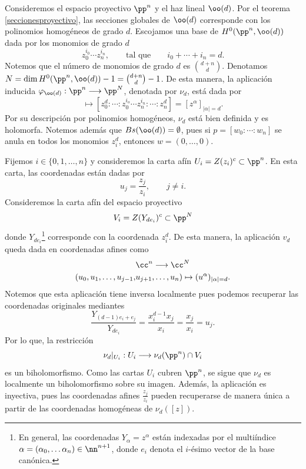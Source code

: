 	\begin{example}
		Consideremos el espacio proyectivo $\pp^n$ y el haz lineal $\oo(d)$. Por el teorema \ref{seccionesproyectivo}, las secciones globales de $\oo(d)$ corresponde con los polinomios homogéneos de grado $d$. Escojamos una base de $H^0(\pp^n,\oo(d))$ dada por los monomios de grado $d$
		\begin{equation*}
			z_0^{i_0}\cdots z_n^{i_n},\qquad\text{tal que}\qquad i_0+\cdots+i_n=d.
		\end{equation*}
		Notemos que el número de monomios de grado $d$ es $\binom{d+n}{d}$. Denotamos $N=\dim H^0(\pp^n,\oo(d))-1=\binom{d+n}{d}-1$.
		De esta manera, la aplicación inducida $\varphi_{\oo(d)}:\pp^n\longrightarrow \pp^N$, denotada por $\nu_d$, está dada por
		\begin{equation*}
			[z_0:\cdots:z_n]\mapsto [z_0^d:\cdots:z_0^{i_o}\cdots z_n^{i_n}:\cdots:z_n^d]=[z^\alpha]_{|\alpha|=d}.
		\end{equation*}
		Por su descripción por polinomios homogéneos, $\nu_d$ está bien definida y es holomorfa. 
		Notemos además que $Bs(\oo(d))=\emptyset$, pues si $p=[w_0:\cdots:w_n]$ se anula en todos los monomios $z_i^d$, entonces $w=(0,\dots,0)$. 
		
		Fijemos $i\in\{0,1,\dots,n\}$ y consideremos la carta afín $U_i=Z(z_i)^c\subset \pp^n$. En esta carta, las coordenadas están dadas por
		\begin{equation*}
			u_j=\frac{z_j}{z_i},\qquad j\neq i.
		\end{equation*}
		Consideremos la carta afín del espacio proyectivo 
		\begin{equation*}
			V_i=Z(Y_{de_i})^c\subset\pp^N
		\end{equation*}
		donde $Y_{de_i}$\footnote{En general, las coordenadas $Y_\alpha=z^\alpha$ están indexadas por el multiíndice $\alpha=(\alpha_0,\dots \alpha_n)\in\nn^{n+1}$, donde $e_i$ denota el $i$-ésimo vector de la base canónica.} corresponde con la coordenada $z_i^d$. De esta manera, la aplicación $v_d$ queda dada en coordenadas afines como
		\begin{align*}
			&\cc^n\longrightarrow \cc^N\\
			(u_0,u_1,\dots,u_{j-1},&u_{j+1},\dots,u_n)\mapsto (u^\alpha)_{|\alpha|=d}.
		\end{align*}
		Notemos que esta aplicación tiene inversa localmente pues podemos recuperar las coordenadas originales mediantes
		\begin{equation*}
			\frac{Y_{(d-1)e_i+e_j}}{Y_{de_i}}=\frac{x_i^{d-1}x_j}{x_i}=\frac{x_j}{x_i}=u_j.
		\end{equation*}
		Por lo que, la restricción
		\begin{equation*}
			\nu_d|_{U_i}:U_i\longrightarrow \nu_d(\pp^n)\cap V_i
		\end{equation*}
		es un biholomorfismo. 
		Como las cartas $U_i$ cubren $\pp^n$, se sigue que $\nu_d$ es localmente un biholomorfismo sobre su imagen. Además, la aplicación es inyectiva, pues las coordenadas afines $ \frac{z_j}{z_i}$ pueden recuperarse de manera única a partir de las coordenadas homogéneas de $\nu_d([z])$.
		

\end{example}
